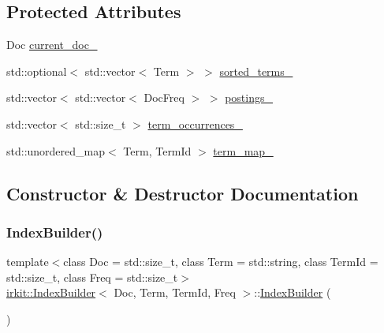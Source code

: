\subsection*{Protected Attributes}
\begin{DoxyCompactItemize}
\item 
Doc \hyperlink{classirkit_1_1IndexBuilder_a52d46fb2bd04b9e5ee0e9fdcf98e2f7b}{current\+\_\+doc\+\_\+}
\item 
std\+::optional$<$ std\+::vector$<$ Term $>$ $>$ \hyperlink{classirkit_1_1IndexBuilder_a7a6b13e964f05c659fe17cf61a9738e9}{sorted\+\_\+terms\+\_\+}
\item 
std\+::vector$<$ std\+::vector$<$ Doc\+Freq $>$ $>$ \hyperlink{classirkit_1_1IndexBuilder_a4dcd133d2afe183e6f5bb379592391c4}{postings\+\_\+}
\item 
std\+::vector$<$ std\+::size\+\_\+t $>$ \hyperlink{classirkit_1_1IndexBuilder_aaa27520f3a0fb37dba049d2c26ad9484}{term\+\_\+occurrences\+\_\+}
\item 
std\+::unordered\+\_\+map$<$ Term, Term\+Id $>$ \hyperlink{classirkit_1_1IndexBuilder_aeebb03b89eeab532f62239e4ea4f0bee}{term\+\_\+map\+\_\+}
\end{DoxyCompactItemize}


\subsection{Constructor \& Destructor Documentation}
\mbox{\label{classirkit_1_1IndexBuilder_ab56476b7728ed2618b8de7511dfe2427}} 
\subsubsection{\texorpdfstring{Index\+Builder()}{IndexBuilder()}}
{\footnotesize\ttfamily template$<$class Doc  = std\+::size\+\_\+t, class Term  = std\+::string, class Term\+Id  = std\+::size\+\_\+t, class Freq  = std\+::size\+\_\+t$>$ \\
\hyperlink{classirkit_1_1IndexBuilder}{irkit\+::\+Index\+Builder}$<$ Doc, Term, Term\+Id, Freq $>$\+::\hyperlink{classirkit_1_1IndexBuilder}{Index\+Builder} (\begin{DoxyParamCaption}{ }\end{DoxyParamCaption})\hspace{0.3cm}{\ttfamily [inline]}}



